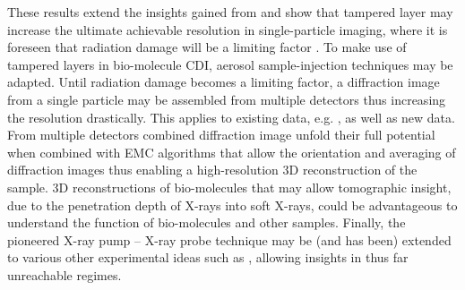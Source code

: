 These results extend the insights gained from \citep{Hoener-2008-JPB} and show that tampered layer may increase the ultimate achievable resolution in single-particle imaging, where it is foreseen that radiation damage will be a limiting factor \citep{Aquila-2015-StrucDyn}. To make use of tampered layers in bio-molecule CDI, aerosol sample-injection techniques may be adapted. Until radiation damage becomes a limiting factor, a diffraction image from a single particle may be assembled from multiple detectors thus increasing the resolution drastically. This applies to existing data, e.g. \citep{Munke-2016-naturedata}, as well as new data. From multiple detectors combined diffraction image unfold their full potential when combined with EMC algorithms \citep{Loh-2009-PRE} that allow the orientation and averaging of diffraction images thus enabling a high-resolution 3D reconstruction of the sample. 3D reconstructions of bio-molecules that may allow tomographic insight, due to the penetration depth of X-rays into soft X-rays, could be advantageous to understand the function of bio-molecules and other samples. Finally, the pioneered X-ray pump -- X-ray probe technique may be (and has been) extended to various other experimental ideas such as \citep{Picon-2016-NatComm,Lehmann-2016-PRA,Kimberg-2016-FD,MacDonald-2016-RSI,Al-Haddad-2017-unpublished,Ferguson-2016-SciAdv}, allowing insights in thus far unreachable regimes.
%
%
%
